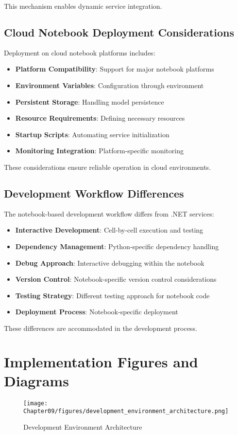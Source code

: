 This mechanism enables dynamic service integration.

\subsection{Cloud Notebook Deployment Considerations}
Deployment on cloud notebook platforms includes:
\begin{itemize}
    \item \textbf{Platform Compatibility}: Support for major notebook platforms
    \item \textbf{Environment Variables}: Configuration through environment
    \item \textbf{Persistent Storage}: Handling model persistence
    \item \textbf{Resource Requirements}: Defining necessary resources
    \item \textbf{Startup Scripts}: Automating service initialization
    \item \textbf{Monitoring Integration}: Platform-specific monitoring
\end{itemize}

These considerations ensure reliable operation in cloud environments.

\subsection{Development Workflow Differences}
The notebook-based development workflow differs from .NET services:
\begin{itemize}
    \item \textbf{Interactive Development}: Cell-by-cell execution and testing
    \item \textbf{Dependency Management}: Python-specific dependency handling
    \item \textbf{Debug Approach}: Interactive debugging within the notebook
    \item \textbf{Version Control}: Notebook-specific version control considerations
    \item \textbf{Testing Strategy}: Different testing approach for notebook code
    \item \textbf{Deployment Process}: Notebook-specific deployment
\end{itemize}

These differences are accommodated in the development process.

\section{Implementation Figures and Diagrams}
\begin{figure}[h]
\centering
\texttt{[image: Chapter09/figures/development\_environment\_architecture.png]}
\caption{Development Environment Architecture}
\label{fig:dev_env_architecture}
\end{figure}

